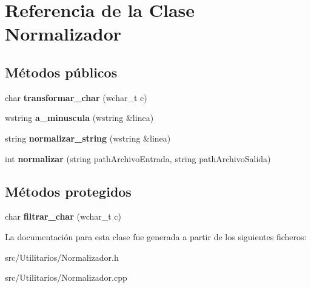 \hypertarget{class_normalizador}{\section{\-Referencia de la \-Clase \-Normalizador}
\label{class_normalizador}
}
\subsection*{\-Métodos públicos}
\begin{DoxyCompactItemize}
\item 
\hypertarget{class_normalizador_a7aa70b2145dedf14779b3b02ff6c2b8c}{char {\bfseries transformar\-\_\-char} (wchar\-\_\-t c)}\label{class_normalizador_a7aa70b2145dedf14779b3b02ff6c2b8c}

\item 
\hypertarget{class_normalizador_a8f95fbcc4185e42f9b8cf21b3f81a382}{wstring {\bfseries a\-\_\-minuscula} (wstring \&linea)}\label{class_normalizador_a8f95fbcc4185e42f9b8cf21b3f81a382}

\item 
\hypertarget{class_normalizador_a4c6798961ec67980735f39e6ea718522}{string {\bfseries normalizar\-\_\-string} (wstring \&linea)}\label{class_normalizador_a4c6798961ec67980735f39e6ea718522}

\item 
\hypertarget{class_normalizador_a15e2c935a049ebf4d1defff5da9ca91a}{int {\bfseries normalizar} (string path\-Archivo\-Entrada, string path\-Archivo\-Salida)}\label{class_normalizador_a15e2c935a049ebf4d1defff5da9ca91a}

\end{DoxyCompactItemize}
\subsection*{\-Métodos protegidos}
\begin{DoxyCompactItemize}
\item 
\hypertarget{class_normalizador_ac0a3f4d9a47ddd681358ddb6bb1fe640}{char {\bfseries filtrar\-\_\-char} (wchar\-\_\-t c)}\label{class_normalizador_ac0a3f4d9a47ddd681358ddb6bb1fe640}

\end{DoxyCompactItemize}


\-La documentación para esta clase fue generada a partir de los siguientes ficheros\-:\begin{DoxyCompactItemize}
\item 
src/\-Utilitarios/\-Normalizador.\-h\item 
src/\-Utilitarios/\-Normalizador.\-cpp\end{DoxyCompactItemize}
